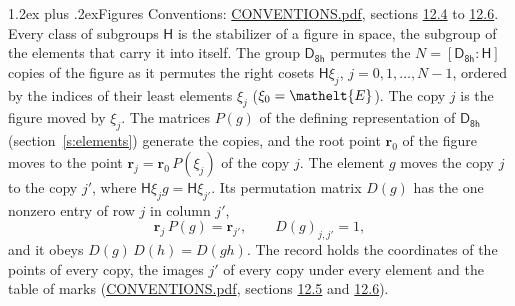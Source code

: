 \documentclass[10pt,a4paper]{article}
\makeatletter
\renewcommand\section{\@startsection{section}{1}{\z@}{-3ex plus -1ex minus -.2ex}%
  {1.2ex plus .2ex}{\normalfont\large\sffamily\bfseries\color{parttitle}}}
\numberwithin{equation}{section}
\newcommand{\eltfont}[1]{{\let\sigma\eltsigma\mathelt{#1}}}
\newcommand{\grp}[1]{\mathsf{#1}}
\newcommand{\cls}[1]{\eltfont{#1}}
\newcommand{\pointr}{\mathbf{r}}
\makeatother
\begin{document}
\section{Figures}\label{s:permutation}
Conventions: \href{../../CONVENTIONS.pdf}{CONVENTIONS.pdf}, sections \href{../../CONVENTIONS.pdf\#conv.12.4}{12.4} to \href{../../CONVENTIONS.pdf\#conv.12.6}{12.6}.
Every class of subgroups $\grp{H}$ is the stabilizer of a figure in space, the subgroup of the elements that carry it into itself. \label{n:local.orbit.size}\label{n:element.coset.least}\label{n:index.coset}The group $\grp{D_{8h}}$ permutes the $N = [\grp{D_{8h}} : \grp{H}]$ copies of the figure as it permutes the right cosets $\grp{H}\xi_j$, $j = 0, 1, \dots, N - 1$, ordered by the indices of their least elements $\xi_j$ ($\xi_0 = \cls{E}$). The copy $j$ is the figure moved by $\xi_j$. The matrices $P(g)$ of the defining representation of $\grp{D_{8h}}$ (section~\ref{s:elements}) generate the copies, and the root point $\pointr_0$ of the figure moves to the point $\pointr_j = \pointr_0\, P(\xi_j)$ of the copy $j$. \label{n:local.coset.image}The element $g$ moves the copy $j$ to the copy $j'$, where $\grp{H}\xi_j g = \grp{H}\xi_{j'}$. \label{n:local.matrix.permutation}Its permutation matrix $D(g)$ has the one nonzero entry of row $j$ in column $j'$,
\begin{equation}\label{e:perm.matrix}\pointr_j\, P(g) = \pointr_{j'}, \qquad D(g)_{j,j'} = 1,\end{equation}
and it obeys $D(g)\, D(h) = D(gh)$. The record holds the coordinates of the points of every copy, the images $j'$ of every copy under every element and the table of marks (\href{../../CONVENTIONS.pdf}{CONVENTIONS.pdf}, sections \href{../../CONVENTIONS.pdf\#conv.12.5}{12.5} and \href{../../CONVENTIONS.pdf\#conv.12.6}{12.6}).
\end{document}
